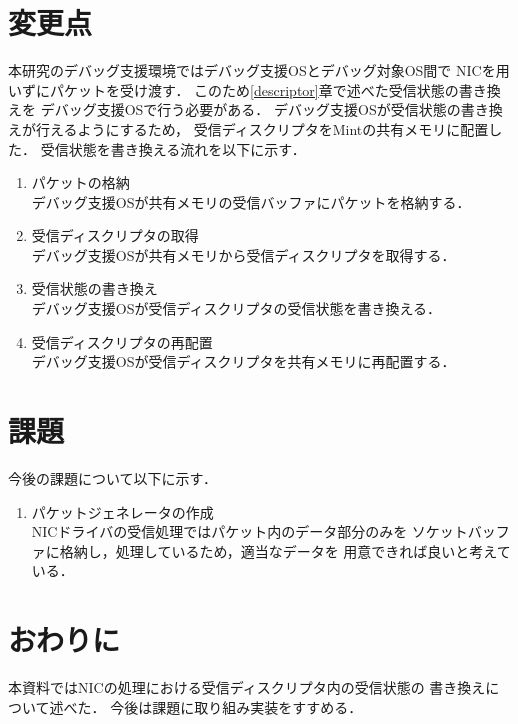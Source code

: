 \documentclass[12pt]{jsarticle}
\begin{document}
\section{変更点}
本研究のデバッグ支援環境ではデバッグ支援OSとデバッグ対象OS間で
NICを用いずにパケットを受け渡す．
このため\ref{descriptor}章で述べた受信状態の書き換えを
デバッグ支援OSで行う必要がある．
デバッグ支援OSが受信状態の書き換えが行えるようにするため，
受信ディスクリプタをMintの共有メモリに配置した．
受信状態を書き換える流れを以下に示す．
\begin{enumerate}
    \item パケットの格納\\
        デバッグ支援OSが共有メモリの受信バッファにパケットを格納する．
    \item 受信ディスクリプタの取得\\
        デバッグ支援OSが共有メモリから受信ディスクリプタを取得する．
    \item 受信状態の書き換え\\
        デバッグ支援OSが受信ディスクリプタの受信状態を書き換える．
    \item 受信ディスクリプタの再配置\\
        デバッグ支援OSが受信ディスクリプタを共有メモリに再配置する．
\end{enumerate}

\section{課題}
今後の課題について以下に示す．
\begin{enumerate}
    \item パケットジェネレータの作成\\
        NICドライバの受信処理ではパケット内のデータ部分のみを
        ソケットバッファに格納し，処理しているため，適当なデータを
        用意できれば良いと考えている．
\end{enumerate}
\section{おわりに}
本資料ではNICの処理における受信ディスクリプタ内の受信状態の
書き換えについて述べた．
今後は課題に取り組み実装をすすめる．
\end{document}
